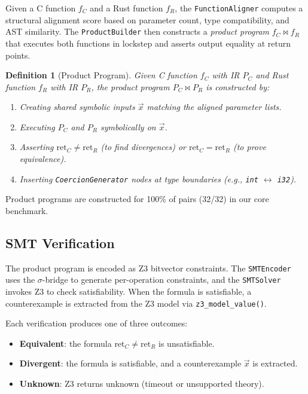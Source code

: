 \documentclass[11pt,a4paper]{article}
\newtheorem{definition}[theorem]{Definition}
\begin{document}
Given a C function $f_C$ and a Rust function $f_R$, the
\texttt{FunctionAligner} computes a structural alignment score based on
parameter count, type compatibility, and AST similarity.  The
\texttt{ProductBuilder} then constructs a \emph{product program}
$f_C \bowtie f_R$ that executes both functions in lockstep and asserts
output equality at return points.

\begin{definition}[Product Program]
Given C function $f_C$ with IR $P_C$ and Rust function $f_R$ with
IR $P_R$, the product program $P_C \bowtie P_R$ is constructed by:
\begin{enumerate}
  \item Creating shared symbolic inputs $\vec{x}$ matching the aligned
    parameter lists.
  \item Executing $P_C$ and $P_R$ symbolically on $\vec{x}$.
  \item Asserting $\text{ret}_C \neq \text{ret}_R$ (to find divergences)
    or $\text{ret}_C = \text{ret}_R$ (to prove equivalence).
  \item Inserting \texttt{CoercionGenerator} nodes at type boundaries
    (e.g., \texttt{int} $\leftrightarrow$ \texttt{i32}).
\end{enumerate}
\end{definition}

Product programs are constructed for 100\% of pairs (32/32) in our
core benchmark.

\subsection{SMT Verification}\label{sec:smt}

The product program is encoded as Z3 bitvector constraints.  The
\texttt{SMTEncoder} uses the $\sigma$-bridge to generate per-operation
constraints, and the \texttt{SMTSolver} invokes Z3 to check
satisfiability.  When the formula is satisfiable, a counterexample is
extracted from the Z3 model via \texttt{z3\_model\_value()}.

Each verification produces one of three outcomes:
\begin{itemize}
  \item \textbf{Equivalent}: the formula
    $\text{ret}_C \neq \text{ret}_R$ is unsatisfiable.
  \item \textbf{Divergent}: the formula is satisfiable, and a
    counterexample $\vec{x}$ is extracted.
  \item \textbf{Unknown}: Z3 returns unknown (timeout or unsupported theory).
\end{itemize}
\end{document}
